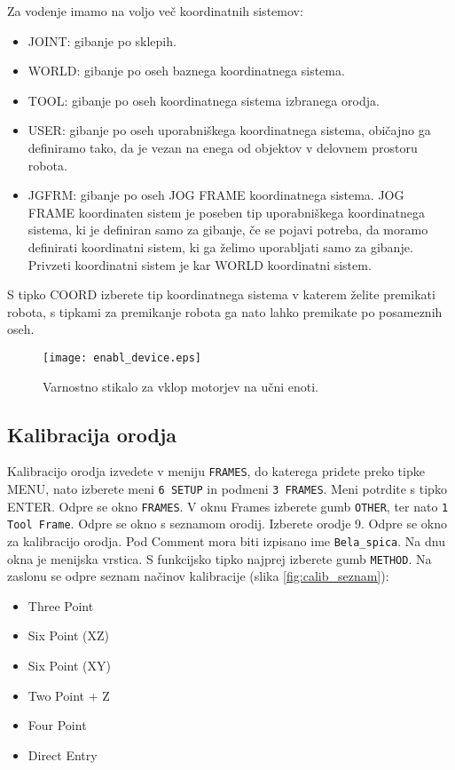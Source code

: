 Za vodenje imamo na voljo več koordinatnih sistemov:

\begin{itemize}
	\item JOINT: gibanje po sklepih.
	\item WORLD: gibanje po oseh baznega koordinatnega sistema.
	\item TOOL: gibanje po oseh koordinatnega sistema izbranega orodja.
	\item USER: gibanje po oseh uporabniškega koordinatnega sistema, običajno ga definiramo tako, da je vezan na enega od objektov v delovnem prostoru robota.
	\item JGFRM: gibanje po oseh JOG FRAME koordinatnega sistema. JOG FRAME koordinaten sistem je poseben tip uporabniškega koordinatnega sistema, ki je definiran samo za gibanje, če se pojavi potreba, da moramo definirati koordinatni sistem, ki ga želimo uporabljati samo za gibanje. Privzeti koordinatni sistem je kar WORLD koordinatni sistem.
\end{itemize} 

S tipko COORD izberete tip koordinatnega sistema v katerem želite premikati robota, s tipkami za premikanje robota ga nato lahko premikate po posameznih oseh. 
\begin{figure}[!hbt]
	\centering
	\texttt{[image: enabl\_device.eps]}
	\caption{Varnostno stikalo za vklop motorjev na učni enoti.}
	\label{fig:enabl_device}
\end{figure}

\subsection{Kalibracija orodja} \label{pog:kalibracija_orodja}

Kalibracijo orodja izvedete v meniju \verb|FRAMES|, do katerega pridete preko tipke MENU, nato izberete meni \verb|6 SETUP| in podmeni \verb|3 FRAMES|. Meni potrdite s tipko ENTER. Odpre se okno \verb|FRAMES|. V oknu Frames izberete gumb \verb|OTHER|, ter nato \verb|1 Tool Frame|. Odpre se okno s seznamom orodij. Izberete orodje 9. Odpre se okno za kalibracijo orodja. Pod Comment mora biti izpisano ime \verb|Bela_spica|. Na dnu okna je menijska vrstica. S funkcijsko tipko najprej izberete gumb \verb|METHOD|. Na zaslonu se odpre seznam načinov kalibracije (slika \ref{fig:calib_seznam}):

\begin{itemize}
	\item Three Point
	\item Six Point (XZ)
	\item Six Point (XY)
	\item Two Point + Z
	\item Four Point
	\item Direct Entry
\end{itemize}

